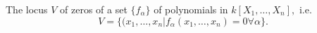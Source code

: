 The locus $ V $ of zeros of a set $ \{ f _{\alpha} \} $ of polynomials in 
$ k[X_1, \ldots , X_n] , $ i.e. 
\[ V = \{ ( x_1, \ldots , x_n | f_{\alpha} ( x_1, \ldots , x_n ) = 0 \forall \alpha \} . \]